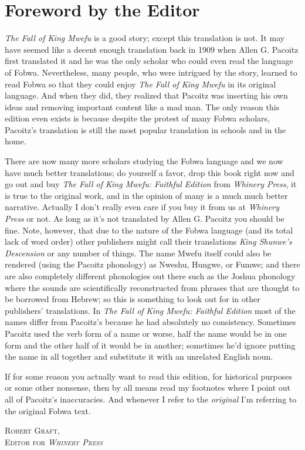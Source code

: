 \chapter*{Foreword by the Editor}
\emph{The Fall of King Mwe\-fu} is a good story; except this translation is not.
It may have seemed like a decent enough translation back in 1909 when Allen G. Pa\-co\-itz first translated it and he was the only scholar who could even read the language of Fo\-bwa.
Nevertheless, many people, who were intrigued by the story, learned to read Fo\-bwa so that they could enjoy \emph{The Fall of King Mwe\-fu} in its original language.
And when they did, they realized that Pa\-co\-itz was inserting his own ideas and removing important content like a mad man.
The only reason this edition even exists is because despite the protest of many Fo\-bwa scholars, Pa\-co\-itz's translation is still the most popular translation in schools and in the home. 

There are now many more scholars studying the Fo\-bwa language and we now have much better translations;
do yourself a favor, drop this book right now and go out and buy \emph{The Fall of King Mwe\-fu: Faithful Edition} from \emph{Whinery Press}, it is true to the original work, and in the opinion of many is a much much better narrative.
Actually I don't really even care if you buy it from us at \emph{Whinery Press} or not.
As long as it's not translated by Allen G. Pa\-co\-itz you should be fine.
Note, however, that due to the nature of the Fo\-bwa language (and its total lack of word order) other publishers might call their translations \emph{King Shunwe's Descension} or any number of things. The name Mwe\-fu itself could also be rendered (using the Pa\-co\-itz phonology) as Nweshu, Hungwe, or Fumwe; and there are also completely different phonologies out there such as the Joshua phonology where the sounds are scientifically reconstructed from phrases that are thought to be borrowed from Hebrew; so this is something to look out for in other publishers' translations. In \emph{The Fall of King Mwe\-fu: Faithful Edition} most of the names differ from Pa\-co\-itz's because he had absolutely no consistency. Sometimes Pa\-co\-itz used the verb form of a name or worse, half the name would be in one form and the other half of it would be in another; sometimes he'd ignore putting the name in all together and substitute it with an unrelated English noun.

If for some reason you actually want to read this edition, for historical purposes or some other nonsense, then by all means read my footnotes where I point out all of Pa\-co\-itz's inaccuracies. And whenever I refer to the \emph{original} I'm referring to the original Fo\-bwa text.
\begin{flushright}
\textsc{
Robert Graft,\\
Editor for \emph{Whinery Press}}
\end{flushright}

